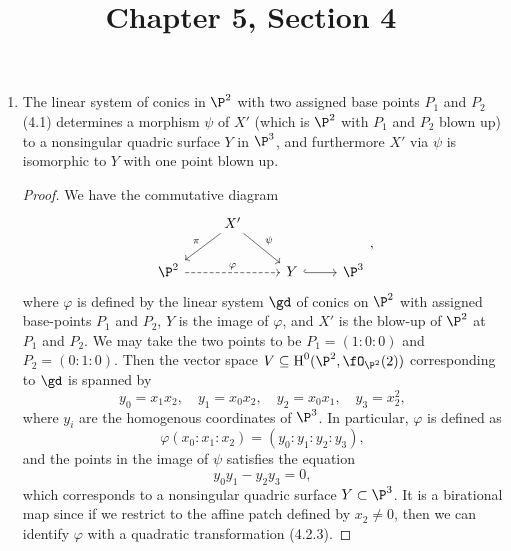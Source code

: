 \documentclass[a4paper]{article}
\title{Chapter 5, Section 4}
\begin{document}
\maketitle

\begin{enumerate} [label=\textbf{\arabic*.}, leftmargin=0em]

      \item The linear system of conics in $\P^2$ with two assigned base points $P_1$ and $P_2$ (4.1) determines a morphism $\psi$ of $X'$ (which is $\P^2$ with $P_1$ and $P_2$ blown up) to a nonsingular quadric surface $Y$ in $\P^3$, and furthermore $X'$ via $\psi$ is isomorphic to $Y$ with one point blown up.

            \begin{proof}
                  We have the commutative diagram
                  \[ \begin{tikzcd}
                              & X' \arrow[ld, "\pi"'] \arrow[rd, "\psi"] &                   &      \\
                              \P^2 \arrow[rr, "\varphi", dashed] &                                         & Y \arrow[r, hook] & \P^3
                        \end{tikzcd} , \]
                  where $\varphi$ is defined by the linear system $\gd$ of conics on $\P^2$ with assigned base-points $P_1$ and $P_2$, $Y$ is the image of $\varphi$, and $X'$ is the blow-up of $\P^2$ at $P_1$ and $P_2$.
                  We may take the two points to be $P_1 = (1 : 0 : 0)$ and $P_2 = (0 : 1 : 0)$.
                  Then the vector space $V \subseteq \cH^0(\P^2, \fO_{\P^2}(2))$ corresponding to $\gd$ is spanned by
                  \begin{equation*}
                        y_0 = x_1 x_2, \quad y_1 = x_0 x_2, \quad y_2  = x_0 x_1, \quad y_3 = x_2^2,
                  \end{equation*}
                  where $y_i$ are the homogenous coordinates of $\P^3$.
                  In particular, $\varphi$ is defined as
                  \begin{equation*}
                        \varphi(x_0 : x_1 : x_2) = (y_0 : y_1 : y_2: y_3),
                  \end{equation*}
                  and the points in the image of $\psi$ satisfies the equation
                  \begin{equation*}
                        y_0 y_1 - y_2 y_3 = 0,
                  \end{equation*}
                  which corresponds to a nonsingular quadric surface $Y \subset \P^3$.
                  It is a birational map since if we restrict to the affine patch defined by $x_2 \neq 0$, then we can identify $\varphi$ with a quadratic transformation (4.2.3).


\end{proof}
\end{enumerate}
\end{document}
